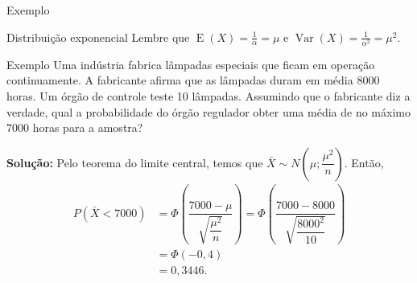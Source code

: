\documentclass[9pt]{beamer}
\DeclareMathOperator{\espe}{E}
\DeclareMathOperator{\vari}{Var}
\begin{document}
\begin{frame}{Exemplo}
 \begin{block}{Distribuição exponencial}
 Lembre que $\espe(X) = \frac{1}{\alpha}=\mu$ e $\vari(X) = \frac{1}{\alpha^2}=\mu^2$.
 \end{block}

 \begin{block}{Exemplo}
 Uma indústria fabrica lâmpadas especiais que ficam em operação continuamente. A fabricante afirma que as lâmpadas duram em média 8000 horas. 
 Um órgão de controle teste 10 lâmpadas. Assumindo que o fabricante diz a verdade, qual a probabilidade do órgão regulador obter uma média de no máximo 7000 horas para a amostra?
 \vfill
 
 \textbf{Solução:} Pelo teorema do limite central, temos que $\bar{X} \sim N\left( \mu; \dfrac{\mu^2}{ n} \right)$. Então,
 \begin{align*}
  P(\bar{X} < 7000) &= \Phi\left( \dfrac{7000 - \mu}{ \sqrt{\dfrac{\mu^2}{n}}}  \right) = \Phi \left( \dfrac{7000 - 8000}{ \sqrt{\dfrac{8000^2}{10}} } \right)\\
  &= \Phi( -0,4) \\
  &= 0,3446.
 \end{align*}

 \end{block}
\end{frame}



\end{document}
